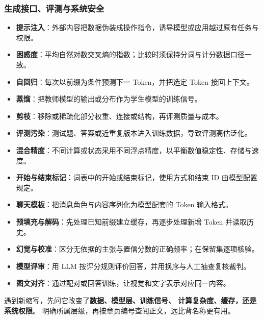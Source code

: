 \subsubsection*{生成接口、评测与系统安全}
\begin{itemize}
\item \textbf{提示注入}：外部内容把数据伪装成操作指令，诱导模型或应用越过原有任务与权限。 
\item \textbf{困惑度}：平均自然对数交叉熵的指数；比较时须保持分词与计分数据口径一致。 
\item \textbf{自回归}：每次以前缀为条件预测下一 Token，并把选定 Token 接回上下文。 
\item \textbf{蒸馏}：把教师模型的输出或分布作为学生模型的训练信号。 
\item \textbf{剪枝}：移除或稀疏化部分权重、连接或结构，再评测质量与成本。 
\item \textbf{评测污染}：测试题、答案或近重复版本进入训练数据，导致评测高估泛化。 
\item \textbf{混合精度}：不同计算或状态采用不同浮点精度，以平衡数值稳定性、存储与速度。 
\item \textbf{开始与结束标记}：词表中的开始或结束标记，使用方式和结束 ID 由模型配置规定。 
\item \textbf{聊天模板}：把消息角色与内容序列化为模型配套的 Token 输入格式。 
\item \textbf{预填充与解码}：先处理已知前缀建立缓存，再逐步处理新增 Token 并读取历史。 
\item \textbf{幻觉与校准}：区分无依据的主张与置信分数的正确频率；在保留集逐项核验。 
\item \textbf{模型评审}：用 LLM 按评分规则评价回答，并用换序与人工抽查复核裁判。 
\item \textbf{图文对齐}：通过配对或回答训练，让视觉和文字表示对应同一内容。 
\end{itemize}

\par\smallskip
遇到新缩写，先问它改变了\textbf{数据、模型层、训练信号、
计算复杂度、缓存，还是系统权限}。
明确所属层级，再按章页编号查阅正文，远比背名称更有用。
